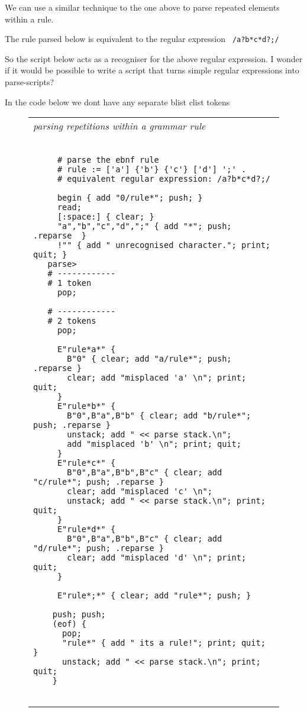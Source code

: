 \documentclass[a4paper,12pt]{article}
\begin{document}
  We can use a similar technique to the one above to parse repeated
  elements within a rule.

  The rule parsed below is equivalent to the regular expression 
 \verb| /a?b*c*d?;/ |

  So the script below acts as a recogniser for the above regular
  expression. I wonder if it would be possible to write a script
  that turns simple regular expressions into parse-scripts?

  In the code below we dont have any separate blist clist tokens
 \begin{figure}
 \begin{tabular}{ l }
 \emph{ parsing repetitions within a grammar rule } \\ 
 \begin{lstlisting}[breaklines] 

     # parse the ebnf rule
     # rule := ['a'] {'b'} {'c'} ['d'] ';' .
     # equivalent regular expression: /a?b*c*d?;/

     begin { add "0/rule*"; push; }
     read;
     [:space:] { clear; }
     "a","b","c","d",";" { add "*"; push; .reparse  }
     !"" { add " unrecognised character."; print; quit; }
   parse>
   # ------------
   # 1 token
     pop;

   # ------------
   # 2 tokens 
     pop; 

     E"rule*a*" { 
       B"0" { clear; add "a/rule*"; push; .reparse }
       clear; add "misplaced 'a' \n"; print; quit; 
     } 
     E"rule*b*" { 
       B"0",B"a",B"b" { clear; add "b/rule*"; push; .reparse }
       unstack; add " << parse stack.\n"; 
       add "misplaced 'b' \n"; print; quit;
     } 
     E"rule*c*" { 
       B"0",B"a",B"b",B"c" { clear; add "c/rule*"; push; .reparse }
       clear; add "misplaced 'c' \n"; 
       unstack; add " << parse stack.\n"; print; quit;
     }
     E"rule*d*" { 
       B"0",B"a",B"b",B"c" { clear; add "d/rule*"; push; .reparse }
       clear; add "misplaced 'd' \n"; print; quit; 
     }

     E"rule*;*" { clear; add "rule*"; push; }

    push; push;
    (eof) {
      pop; 
      "rule*" { add " its a rule!"; print; quit; }
      unstack; add " << parse stack.\n"; print; quit;
    } 
   
 \end{lstlisting} 
 \end{tabular} 

 \end{figure}
\end{document}

